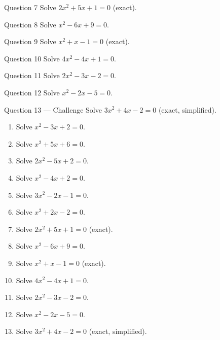 \documentclass[11pt]{article}
\begin{document}
\begin{qbox}{Question 7}
Solve $2x^2+5x+1=0$ (exact).\workspace{2.4cm}
\end{qbox}

\begin{qbox}{Question 8}
Solve $x^2-6x+9=0$.\workspace{2.0cm}
\end{qbox}

\begin{qbox}{Question 9}
Solve $x^2+x-1=0$ (exact).\workspace{2.4cm}
\end{qbox}

\begin{qbox}{Question 10}
Solve $4x^2-4x+1=0$.\workspace{2.2cm}
\end{qbox}

\begin{qbox}{Question 11}
Solve $2x^2-3x-2=0$.\workspace{2.4cm}
\end{qbox}

\begin{qbox}{Question 12}
Solve $x^2-2x-5=0$.\workspace{2.4cm}
\end{qbox}

\begin{qbox}{Question 13 --- Challenge}
Solve $3x^2+4x-2=0$ (exact, simplified).\workspace{2.8cm}
\end{qbox}

\clearpage
{}

\begin{recapbox}
\begin{multicols}{2}
\small
\begin{enumerate}[leftmargin=*,itemsep=3pt]
  \item Solve $x^2-3x+2=0$.
  \item Solve $x^2+5x+6=0$.
  \item Solve $2x^2-5x+2=0$.
  \item Solve $x^2-4x+2=0$.
  \item Solve $3x^2-2x-1=0$.
  \item Solve $x^2+2x-2=0$.
  \item Solve $2x^2+5x+1=0$ (exact).
  \item Solve $x^2-6x+9=0$.
  \item Solve $x^2+x-1=0$ (exact).
  \item Solve $4x^2-4x+1=0$.
  \item Solve $2x^2-3x-2=0$.
  \item Solve $x^2-2x-5=0$.
  \item Solve $3x^2+4x-2=0$ (exact, simplified).
\end{enumerate}
\end{multicols}
\end{recapbox}
\end{document}
